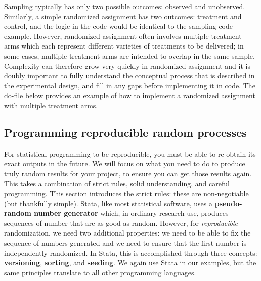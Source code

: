 
Sampling typically has only two possible outcomes: observed and unobserved.
Similarly, a simple randomized assignment has two outcomes: treatment and control,
and the logic in the code would be identical to the sampling code example.
However, randomized assignment often involves multiple treatment arms
which each represent different varieties of treatments to be delivered;
in some cases, multiple treatment arms are intended to overlap in the same sample.
Complexity can therefore grow very quickly in randomized assignment
and it is doubly important to fully understand the conceptual process
that is described in the experimental design,
and fill in any gaps before implementing it in code.
The do-file below provides an example of how to implement
a randomized assignment with multiple treatment arms.



\subsection{Programming reproducible random processes}

For statistical programming to be reproducible,
you must be able to re-obtain its exact outputs in the future.\cite{orozco2018make}
We will focus on what you need to do to produce
truly random results for your project,
to ensure you can get those results again.
This takes a combination of strict rules, solid understanding, and careful programming.
This section introduces the strict rules:
these are non-negotiable (but thankfully simple).
Stata, like most statistical software, uses a \textbf{pseudo-random number generator}
which, in ordinary research use, 
produces sequences of number that are as good as random.
However, for \textit{reproducible} randomization, we need two additional properties:
we need to be able to fix the sequence of numbers generated and
we need to ensure that the first number is independently randomized.
In Stata, this is accomplished through three concepts:
\textbf{versioning}, \textbf{sorting}, and \textbf{seeding}.
We again use Stata in our examples,
but the same principles translate to all other programming languages.

